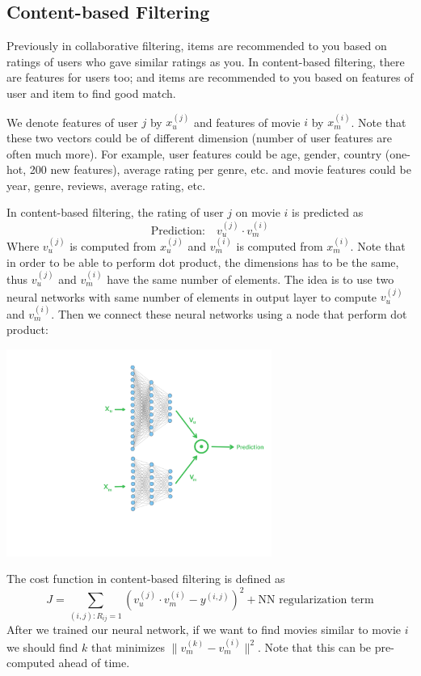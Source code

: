 \documentclass[a4paper, 12pt]{book}
\begin{document}
\subsection{Content-based Filtering}

Previously in collaborative filtering, items are recommended to you based on ratings of users who gave similar ratings as you. In content-based filtering, there are features for users too; and items are recommended to you based on features of user and item to find good match.

We denote features of user $j$ by $x_u^{(j)}$ and features of movie $i$ by $x_m^{(i)}$. Note that these two vectors could be of different dimension (number of user features are often much more). For example, user features could be age, gender, country (one-hot, 200 new features), average rating per genre, etc. and movie features could be year, genre, reviews, average rating, etc.

In content-based filtering, the rating of user $j$ on movie $i$ is predicted as \[\text{Prediction:} \quad v_u^{(j)} \cdot v_m^{(i)}\] Where $v_u^{(j)}$ is computed from $x_u^{(j)}$ and $v_m^{(i)}$ is computed from $x_m^{(i)}$. Note that in order to be able to perform dot product, the dimensions has to be the same, thus $v_u^{(j)}$ and $v_m^{(i)}$ have the same number of elements. The idea is to use two neural networks with same number of elements in output layer to compute $v_u^{(j)}$ and $v_m^{(i)}$. Then we connect these neural networks using a node that perform dot product:
\begin{center}
    \includegraphics[width=0.65\textwidth, trim={14cm 8cm 2cm 2cm}]{graphics/contentbased.png}
\end{center}

The cost function in content-based filtering is defined as \[J = \sum_{(i,j): R_{ij}=1} (v_u^{(j)}\cdot v_m^{(i)} - y^{(i,j)})^2 + \text{NN regularization term}\] After we trained our neural network, if we want to find movies similar to movie $i$ we should find $k$ that minimizes $\| v_m^{(k)} - v_m^{(i)} \|^2$. Note that this can be pre-computed ahead of time.
\end{document}
